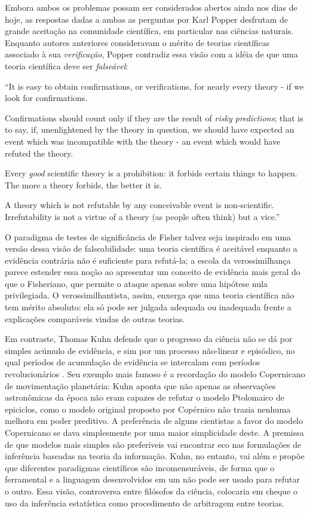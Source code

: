 Embora ambos os problemas possam ser considerados abertos ainda nos dias de hoje,
as respostas dadas a ambas as perguntas por Karl Popper desfrutam de grande aceitação na comunidade científica, em particular
nas ciências naturais. 
Enquanto autores anteriores consideravam o mérito de teorias científicas associado à sua {\em verificação}, Popper
contradiz essa visão com a idéia de que uma teoria científica deve ser {\em falseável}:

``It is easy to obtain confirmations, or verifications, for nearly every theory - if we look for confirmations.

Confirmations should count only if they are the result of {\em risky predictions}; that is to say, if, unenlightened by 
the theory in question, we should have expected an event which was incompatible with the theory - an 
event which would have refuted the theory.

Every {\em good} scientific theory is a prohibition: it forbids certain things to happen. The more a theory forbids, the 
better it is.

A theory which is not refutable by any conceivable event is non-scientific. Irrefutability is not a virtue of a 
theory (as people often think) but a vice.'' \citep{Popper63}

O paradigma de testes de significância de Fisher talvez seja inspirado em uma versão dessa visão de falseabilidade: uma
teoria científica é aceitável enquanto a evidência contrária não é suficiente para refutá-la; a escola da verossimilhança
parece estender essa noção ao apresentar um conceito de evidência mais geral do que o Fisheriano, que permite o ataque apenas
sobre uma hipótese nula privilegiada. O verossimilhantista, assim, enxerga que uma teoria científica não tem mérito absoluto:
ela só pode ser julgada adequada ou inadequada frente a explicações comparáveis vindas de outras teorias.

Em contraste, Thomas Kuhn defende que o progresso da ciência não se dá por
simples acúmulo de evidência, e sim por um processo não-linear e episódico, no qual períodos de acumulação de evidência se
intercalam com períodos revolucionários \citep{Kuhn62}. 
Seu exemplo mais famoso é a recordação do modelo Copernicano de movimentação planetária:
Kuhn aponta que não apenas as observações astronômicas da época não eram capazes de refutar o modelo Ptolomaico de epiciclos,
como o modelo original proposto por Copérnico não trazia nenhuma melhora em poder preditivo. A preferência de alguns cientistas
a favor do modelo Copernicano se dava simplesmente por uma maior simplicidade deste. A premissa de que modelos mais simples
são preferíveis vai encontrar eco nas formulações de inferência baseadas na teoria da informação. Kuhn, no entanto, vai além
e propõe que diferentes paradigmas científicos são incomensuráveis, de forma que o ferramental e a linguagem desenvolvidos
em um não pode ser usado para refutar o outro. Essa visão, controversa entre filósofos da ciência, colocaria em cheque o uso da
inferência estatística como procedimento de arbitragem entre teorias.

